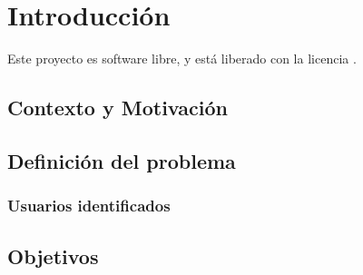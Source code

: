 \chapter{Introducción}

Este proyecto es software libre, y está liberado con la licencia \cite{gplv3}.

\section{Contexto y Motivación}

\section{Definición del problema}

    \subsection{Usuarios identificados}

\section{Objetivos}
